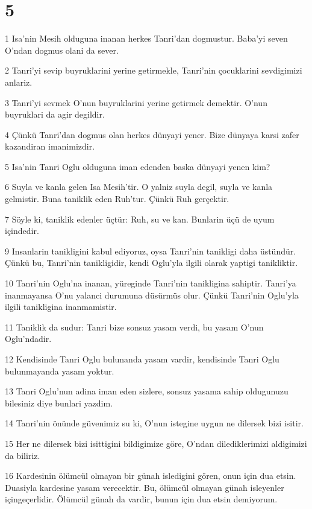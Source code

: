 \chapter{5}

\par 1 Isa'nin Mesih olduguna inanan herkes Tanri'dan dogmustur. Baba'yi seven O'ndan dogmus olani da sever.
\par 2 Tanri'yi sevip buyruklarini yerine getirmekle, Tanri'nin çocuklarini sevdigimizi anlariz.
\par 3 Tanri'yi sevmek O'nun buyruklarini yerine getirmek demektir. O'nun buyruklari da agir degildir.
\par 4 Çünkü Tanri'dan dogmus olan herkes dünyayi yener. Bize dünyaya karsi zafer kazandiran imanimizdir.
\par 5 Isa'nin Tanri Oglu olduguna iman edenden baska dünyayi yenen kim?
\par 6 Suyla ve kanla gelen Isa Mesih'tir. O yalniz suyla degil, suyla ve kanla gelmistir. Buna taniklik eden Ruh'tur. Çünkü Ruh gerçektir.
\par 7 Söyle ki, taniklik edenler üçtür: Ruh, su ve kan. Bunlarin üçü de uyum içindedir.
\par 9 Insanlarin tanikligini kabul ediyoruz, oysa Tanri'nin tanikligi daha üstündür. Çünkü bu, Tanri'nin tanikligidir, kendi Oglu'yla ilgili olarak yaptigi tanikliktir.
\par 10 Tanri'nin Oglu'na inanan, yüreginde Tanri'nin tanikligina sahiptir. Tanri'ya inanmayansa O'nu yalanci durumuna düsürmüs olur. Çünkü Tanri'nin Oglu'yla ilgili tanikligina inanmamistir.
\par 11 Taniklik da sudur: Tanri bize sonsuz yasam verdi, bu yasam O'nun Oglu'ndadir.
\par 12 Kendisinde Tanri Oglu bulunanda yasam vardir, kendisinde Tanri Oglu bulunmayanda yasam yoktur.
\par 13 Tanri Oglu'nun adina iman eden sizlere, sonsuz yasama sahip oldugunuzu bilesiniz diye bunlari yazdim.
\par 14 Tanri'nin önünde güvenimiz su ki, O'nun istegine uygun ne dilersek bizi isitir.
\par 15 Her ne dilersek bizi isittigini bildigimize göre, O'ndan dilediklerimizi aldigimizi da biliriz.
\par 16 Kardesinin ölümcül olmayan bir günah isledigini gören, onun için dua etsin. Duasiyla kardesine yasam verecektir. Bu, ölümcül olmayan günah isleyenler içingeçerlidir. Ölümcül günah da vardir, bunun için dua etsin demiyorum.
